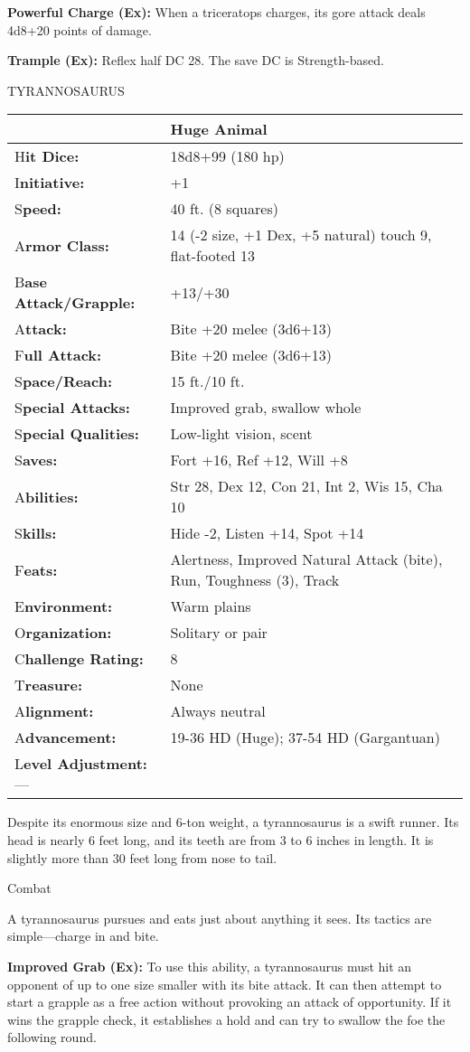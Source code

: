 \documentclass{article}
\begin{document}
\textbf{Powerful Charge (Ex):} When a triceratops charges, its gore attack deals 
4d8+20 points of damage.

\textbf{Trample (Ex):} Reflex half DC 28. The save DC is Strength-based.

\vspace{12pt}
TYRANNOSAURUS

\begin{tabular}{|>{\raggedright}p{91pt}|>{\raggedright}p{222pt}|}
\hline
  & Huge Animal\tabularnewline
\hline
H\textbf{it Dice:} & 18d8+99 (180 hp)\tabularnewline
\hline
I\textbf{nitiative:} & +1\tabularnewline
\hline
S\textbf{peed:} & 40 ft. (8 squares)\tabularnewline
\hline
A\textbf{rmor Class:} & 14 (-2 size, +1 Dex, +5 natural) touch 9, flat-footed 13\tabularnewline
\hline
B\textbf{ase Attack/Grapple:} & +13/+30\tabularnewline
\hline
A\textbf{ttack:} & Bite +20 melee (3d6+13)\tabularnewline
\hline
F\textbf{ull Attack:} & Bite +20 melee (3d6+13)\tabularnewline
\hline
S\textbf{pace/Reach:} & 15 ft./10 ft.\tabularnewline
\hline
S\textbf{pecial Attacks:} & Improved grab, swallow whole\tabularnewline
\hline
S\textbf{pecial Qualities:} & Low-light vision, scent\tabularnewline
\hline
S\textbf{aves:} & Fort +16, Ref +12, Will +8\tabularnewline
\hline
A\textbf{bilities:} & Str 28, Dex 12, Con 21, Int 2, Wis 15, Cha 10\tabularnewline
\hline
S\textbf{kills:} & Hide -2, Listen +14, Spot +14\tabularnewline
\hline
F\textbf{eats:} & Alertness, Improved Natural Attack (bite), Run, Toughness (3), 
Track\tabularnewline
\hline
E\textbf{nvironment:} & Warm plains\tabularnewline
\hline
O\textbf{rganization:} & Solitary or pair\tabularnewline
\hline
C\textbf{hallenge Rating:} & 8\tabularnewline
\hline
T\textbf{reasure:} & None\tabularnewline
\hline
A\textbf{lignment:} & Always neutral\tabularnewline
\hline
A\textbf{dvancement:} & 19-36 HD (Huge); 37-54 HD (Gargantuan)\tabularnewline
\hline
L\textbf{evel Adjustment:}--- & \tabularnewline
\hline
\end{tabular}

Despite its enormous size and 6-ton weight, a tyrannosaurus is a swift runner. 
Its head is nearly 6 feet long, and its teeth are from 3 to 6 inches in length. 
It is slightly more than 30 feet long from nose to tail.

Combat

A tyrannosaurus pursues and eats just about anything it sees. Its tactics are simple---charge 
in and bite.

\textbf{Improved Grab (Ex):} To use this ability, a tyrannosaurus must hit an opponent 
of up to one size smaller with its bite attack. It can then attempt to start a 
grapple as a free action without provoking an attack of opportunity. If it wins 
the grapple check, it establishes a hold and can try to swallow the foe the following 
round.
\end{document}
